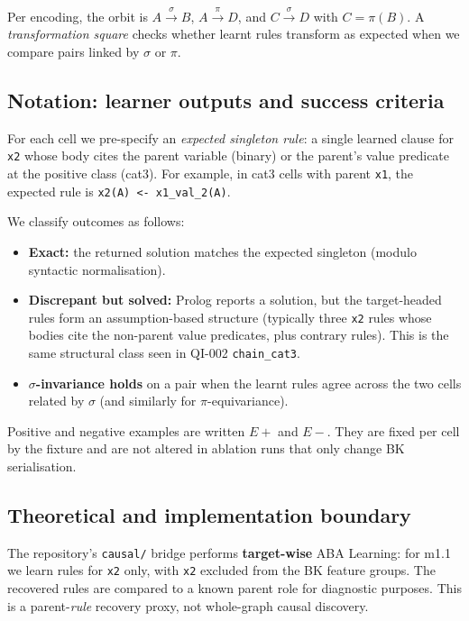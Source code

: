 \documentclass[11pt,a4paper]{article}
\begin{document}
Per encoding, the orbit is $A \xrightarrow{\sigma} B$, $A \xrightarrow{\pi} D$, and
$C \xrightarrow{\sigma} D$ with $C = \pi(B)$. A \emph{transformation square} checks whether
 learnt rules transform as expected when we compare pairs linked by $\sigma$ or $\pi$.

\subsection{Notation: learner outputs and success criteria}

For each cell we pre-specify an \emph{expected singleton rule}: a single learned clause for
\texttt{x2} whose body cites the parent variable (binary) or the parent's value predicate at the
positive class (cat3). For example, in cat3 cells with parent \texttt{x1}, the expected rule is
\texttt{x2(A) <- x1\_val\_2(A)}.

We classify outcomes as follows:

\begin{itemize}
  \item \textbf{Exact:} the returned solution matches the expected singleton (modulo syntactic
  normalisation).
  \item \textbf{Discrepant but solved:} Prolog reports a solution, but the target-headed rules
  form an assumption-based structure (typically three \texttt{x2} rules whose bodies cite the
  non-parent value predicates, plus contrary rules). This is the same structural class seen in
  QI-002 \texttt{chain\_cat3}.
  \item \textbf{$\sigma$-invariance holds} on a pair when the learnt rules agree across the two
  cells related by $\sigma$ (and similarly for $\pi$-equivariance).
\end{itemize}

Positive and negative examples are written $E+$ and $E-$. They are fixed per cell by the fixture
and are not altered in ablation runs that only change BK serialisation.

\subsection{Theoretical and implementation boundary}

The repository's \texttt{causal/} bridge performs \textbf{target-wise} ABA Learning: for m1.1 we
learn rules for \texttt{x2} only, with \texttt{x2} excluded from the BK feature groups. The
recovered rules are compared to a known parent role for diagnostic purposes. This is a
parent-\emph{rule} recovery proxy, not whole-graph causal discovery.
\end{document}
